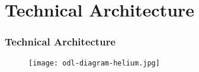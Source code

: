 \section{Technical Architecture}

\begin{frame}[allowframebreaks]
\frametitle{Technical Architecture}

\begin{center}
  \begin{figure}
    \texttt{[image: odl-diagram-helium.jpg]}
  \end{figure}
\end{center}

\end{frame}
